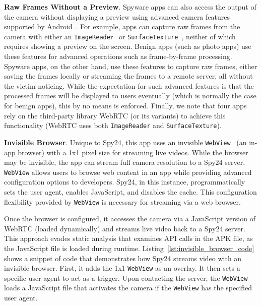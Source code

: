 \documentclass[sigconf,balance=false]{acmart}
\newcommand{\alex}[1]{\textcolor{chicagomaroon}{\noindent[AL: #1]}}
\newcommand{\geoff}[1]{\textcolor{purple}{\noindent[GV: #1]}}
\newcommand{\alex}[1]{}
\newcommand{\geoff}[1]{}
\begin{document}
\textbf{Raw Frames Without a Preview}.
Spyware apps can also access the output of the camera without displaying a
preview using advanced camera features supported by
Android~\cite{Cameraca74:online}. For example, apps can capture raw frames from
the camera with either an \texttt{ImageReade}r~\cite{Cameraca74:online} or
\texttt{SurfaceTexture}~\cite{SurfaceT78:online}, neither of which requires showing a
preview on the screen.
Benign apps (such as photo apps) use these
features for advanced operations such as frame-by-frame processing. Spyware
apps, on the other hand, use these features to capture raw frames, either saving
the frames locally or streaming the frames to a remote server, all without the
victim noticing. While the expectation for such advanced features is that the
processed frames will be displayed to users eventually (which is normally the
case for benign apps), this by no means is enforced. Finally, we note that four
apps rely on the third-party library WebRTC (or its variants) to achieve this functionality (WebRTC uses both \texttt{ImageReader} and \texttt{SurfaceTexture}).


\textbf{Invisible Browser}. Unique to Spy24, this app uses an invisible
\texttt{WebView}~\cite{WebViewA25:online} (an in-app browser) with a 1x1 pixel size for
streaming live videos. While the browser may be invisible, the app can stream
full camera resolution to a Spy24 server.
\texttt{WebView} allows users to browse web content in an app while providing advanced
configuration options to developers. Spy24, in this instance, programmatically sets
the user agent, enables JavaScript, and disables the cache. This configuration
flexibility provided by \texttt{WebView} is necessary for streaming via a web browser.

Once the browser is configured, it accesses the camera via a JavaScript version
of WebRTC (loaded dynamically) and streams live video back to a Spy24 server.
This approach evades static analysis that examines API calls in the APK file, as
the JavaScript file is loaded during runtime.
Listing~\ref{lst:invisible_browser_code} shows a snippet of code that
demonstrates how Spy24 streams video with an invisible browser. First, it adds the 1x1 \texttt{WebView} as an overlay.  It then sets a specific user
agent to act as a trigger. Upon contacting the server, the \texttt{WebView} loads a
JavaScript file that activates the camera if the \texttt{WebView} has the specified user
agent.
\end{document}
